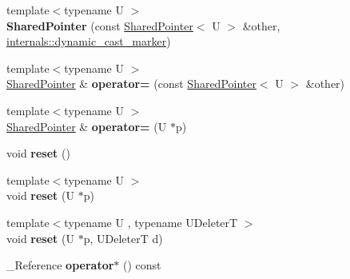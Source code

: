 \begin{DoxyCompactItemize}
\item 
\mbox{\label{classcugar_1_1_shared_pointer_a1d0fc9369ba397276c57be3fdc33549b}} 
{\footnotesize template$<$typename U $>$ }\\{\bfseries Shared\+Pointer} (const \hyperlink{classcugar_1_1_shared_pointer}{Shared\+Pointer}$<$ U $>$ \&other, \hyperlink{structcugar_1_1internals_1_1dynamic__cast__marker}{internals\+::dynamic\+\_\+cast\+\_\+marker})
\item 
\mbox{\label{classcugar_1_1_shared_pointer_af5f2a38e1711ceff08f8327a66b867ad}} 
{\footnotesize template$<$typename U $>$ }\\\hyperlink{classcugar_1_1_shared_pointer}{Shared\+Pointer} \& {\bfseries operator=} (const \hyperlink{classcugar_1_1_shared_pointer}{Shared\+Pointer}$<$ U $>$ \&other)
\item 
\mbox{\label{classcugar_1_1_shared_pointer_a5527a4da891f071d98e3ed3b1e9902cc}} 
{\footnotesize template$<$typename U $>$ }\\\hyperlink{classcugar_1_1_shared_pointer}{Shared\+Pointer} \& {\bfseries operator=} (U $\ast$p)
\item 
\mbox{\label{classcugar_1_1_shared_pointer_aff36ba2fb54d5b19b8628b4864f1ee7c}} 
void {\bfseries reset} ()
\item 
\mbox{\label{classcugar_1_1_shared_pointer_a46ba620d9febfbaee3a1931b0489af3e}} 
{\footnotesize template$<$typename U $>$ }\\void {\bfseries reset} (U $\ast$p)
\item 
\mbox{\label{classcugar_1_1_shared_pointer_a23a1a458eaea0b89ba3a78b88486eeb1}} 
{\footnotesize template$<$typename U , typename U\+DeleterT $>$ }\\void {\bfseries reset} (U $\ast$p, U\+DeleterT d)
\item 
\mbox{\label{classcugar_1_1_shared_pointer_a96add72413d2b2db8338b349a9ccadf5}} 
\+\_\+\+Reference {\bfseries operator$\ast$} () const
\item 
\mbox{\label{classcugar_1_1_shared_pointer_ac0d959947db03ef245422558775ff8d7}} 

\end{DoxyCompactItemize}

